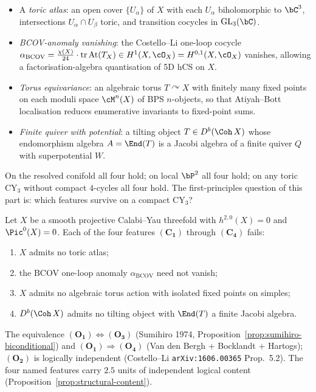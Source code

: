 \begin{itemize}[leftmargin=2em]
\item[$(\mathbf{C_1})$] A \emph{toric atlas}: an open cover $\{U_\alpha\}$
 of $X$ with each $U_\alpha$ biholomorphic to $\bC^3$, intersections
 $U_\alpha \cap U_\beta$ toric, and transition cocycles in
 $\mathrm{GL}_3(\bC)$.
\item[$(\mathbf{C_2})$] \emph{BCOV-anomaly vanishing}: the Costello--Li
 one-loop cocycle $\alpha_{\mathrm{BCOV}} = \tfrac{\chi(X)}{24}
 \cdot \mathrm{tr}\,\mathrm{At}(T_X) \in H^{1}(X, \cO_X) =
 H^{0,1}(X, \cO_X)$ vanishes, allowing a factorisation-algebra
 quantisation of 5D hCS on $X$.
\item[$(\mathbf{C_3})$] \emph{Torus equivariance}: an algebraic torus
 $T \curvearrowright X$ with finitely many fixed points on each
 moduli space $\cM^n(X)$ of BPS $n$-objects, so that
 Atiyah--Bott localisation reduces enumerative invariants to fixed-point
 sums.
\item[$(\mathbf{C_4})$] \emph{Finite quiver with potential}: a tilting
 object $T \in D^b(\Coh\,X)$ whose endomorphism algebra $A = \End(T)$
 is a Jacobi algebra of a finite quiver $Q$ with superpotential $W$.
\end{itemize}

On the resolved conifold all four hold; on local $\bP^2$ all four hold;
on any toric CY$_3$ without compact $4$-cycles all four hold. The
first-principles question of this part is: which features survive on a
compact CY$_3$?

\begin{theorem}
\label{thm:four-obstructions}
Let $X$ be a smooth projective Calabi--Yau threefold with $h^{2,0}(X) = 0$
and $\Pic^0(X) = 0$. Each of the four features $(\mathbf{C_1})$ through
$(\mathbf{C_4})$ fails:
\begin{enumerate}[label=\emph{$(\mathbf{O_\arabic*})$}, leftmargin=2.5em]
\item $X$ admits no toric atlas;
\item the BCOV one-loop anomaly $\alpha_{\mathrm{BCOV}}$ need not
 vanish;
\item $X$ admits no algebraic torus action with isolated fixed points on
 simples;
\item $D^b(\Coh\,X)$ admits no tilting object with $\End(T)$ a finite
 Jacobi algebra.
\end{enumerate}
The equivalence $(\mathbf{O_1}) \Leftrightarrow (\mathbf{O_3})$ (Sumihiro
1974, Proposition~\ref{prop:sumihiro-biconditional}) and
$(\mathbf{O_1}) \Rightarrow (\mathbf{O_4})$ (Van den Bergh + Bocklandt
+ Hartogs); $(\mathbf{O_2})$ is logically independent (Costello--Li
\texttt{arXiv:1606.00365} Prop.~5.2). The four named features carry
$2.5$ units of independent logical content
(Proposition~\ref{prop:structural-content}).
\end{theorem}

